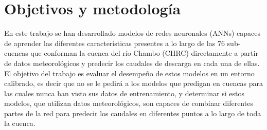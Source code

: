 







\section{Objetivos y metodología}

En este trabajo se han desarrollado modelos de redes neuronales (ANNs) capaces de aprender las diferentes características presentes a lo largo
de las 76 sub-cuencas que conforman la cuenca del río Chambo (CHRC) directamente a partir de datos meteorológicos y predecir los caudales de 
descarga en cada una de ellas. 
El objetivo del trabajo es evaluar el desempeño de estos modelos en un entorno calibrado, es decir que no se le pedirá
a los modelos que predigan en cuencas para las cuales nunca han visto sus datos de entrenamiento, 
y  determinar si estos modelos, que utilizan datos  meteorológicos, 
son capaces de combinar diferentes partes de la red para predecir los caudales en diferentes puntos a lo largo de toda la cuenca. 

